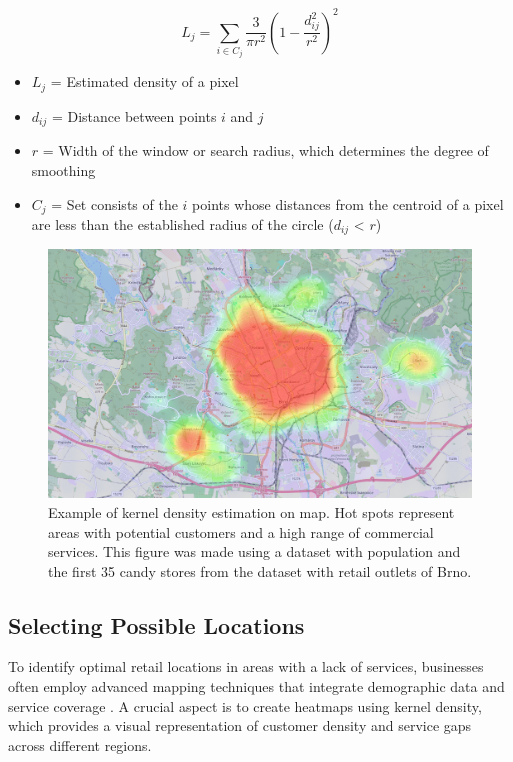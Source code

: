 \begin{equation}
    L_j=\sum_{i \in C_j} \frac{3}{\pi r^2} \left(1 - \frac{d_{ij}^2}{r^2}\right)^2
    \label{eq:point-density}
\end{equation}

\begin{itemize}
    \item{$L_j$ = Estimated density of a pixel}
    \item {$d_{ij}$ = Distance between points $i$ and $j$}
    \item {$r$ = Width of the window or search radius, which determines the degree of smoothing}
    \item {$C_j$ = Set consists of the $i$ points whose distances from the centroid of a pixel are less than the established radius of the circle ($d_{ij}$ < $r$)}
\end{itemize}

\begin{figure}[ht]
	\centering
	\includegraphics[width=1\textwidth]{obrazky-figures/ch2/kernel-density-example.png}
	\caption{Example of kernel density estimation on map. Hot spots represent areas with potential customers and a high range of commercial services. This figure was made using a dataset with population and the first 35 candy stores from the dataset with retail outlets of Brno.}
	\label{fig:kernelDensityExample}
\end{figure}

\subsection{Selecting Possible Locations}

To identify optimal retail locations in areas with a lack of services, businesses often employ advanced mapping techniques that integrate demographic data and service coverage \cite{roig2013retail}. A crucial aspect is to create heatmaps using kernel density, which provides a visual representation of customer density and service gaps across different regions. 


